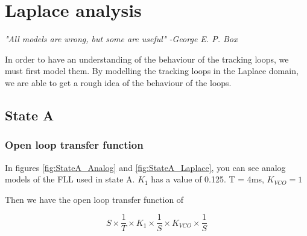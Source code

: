 \chapter{Laplace analysis}
\label{ch:LaplaceAnalysis}

\emph{"All models are wrong, but some are useful" -George E. P. Box}


\begin{table}[!htb]
\caption{Test inputs for evaluating errors \cite{Nise}}
\label{tab:LaplaceTestInputs}
\end{table}






In order to have an understanding of the behaviour of the tracking loops, we must first model them. By modelling the tracking loops in the Laplace domain, we are able to get a rough idea of the behaviour of the loops. 

\section{State A}
\subsection{Open loop transfer function}
In figures \ref{fig:StateA_Analog} and \ref{fig:StateA_Laplace}, you can see analog models of the FLL used in state A. $K_1$ has a value of 0.125. T = 4ms, $K_{VCO} = 1$

Then we have the open loop transfer function of 

\begin{equation}
S \times \frac{1}{T} \times K_1 \times \frac{1}{S} \times  
K_{VCO} \times \frac{1}{S}
\end{equation}

